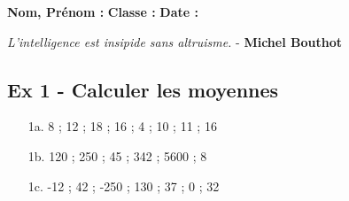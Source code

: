 



\textbf{Nom, Prénom :} \hspace{8cm} \textbf{Classe :} \hspace{3cm} \textbf{Date :}\\

\vspace{-0.5cm} \begin{center}
  \textit{L'intelligence est insipide sans altruisme.}  - \textbf{Michel Bouthot}
\end{center}

\subsection*{Ex 1 - Calculer les moyennes}

\begin{enumerate}
  \item[1a.] 8 ; 12 ; 18 ; 16 ; 4 ; 10 ; 11 ; 16 \\ \Pointilles[4]
  \item[1b.] 120 ; 250 ; 45 ; 342 ; 5600 ; 8 \\ \Pointilles[4]
  \item[1c.] -12 ; 42 ; -250 ; 130 ; 37 ; 0 ; 32 \\ \Pointilles[4]
\end{enumerate} 



